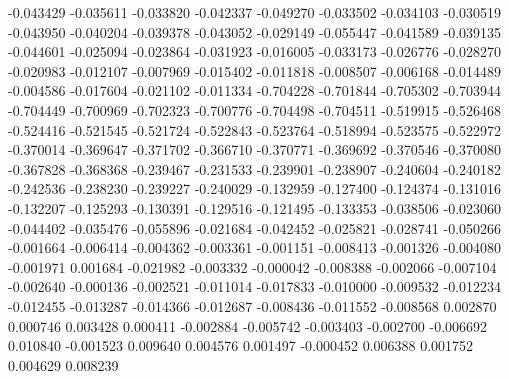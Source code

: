 -0.043429
-0.035611
-0.033820
-0.042337
-0.049270
-0.033502
-0.034103
-0.030519
-0.043950
-0.040204
-0.039378
-0.043052
-0.029149
-0.055447
-0.041589
-0.039135
-0.044601
-0.025094
-0.023864
-0.031923
-0.016005
-0.033173
-0.026776
-0.028270
-0.020983
-0.012107
-0.007969
-0.015402
-0.011818
-0.008507
-0.006168
-0.014489
-0.004586
-0.017604
-0.021102
-0.011334
-0.704228
-0.701844
-0.705302
-0.703944
-0.704449
-0.700969
-0.702323
-0.700776
-0.704498
-0.704511
-0.519915
-0.526468
-0.524416
-0.521545
-0.521724
-0.522843
-0.523764
-0.518994
-0.523575
-0.522972
-0.370014
-0.369647
-0.371702
-0.366710
-0.370771
-0.369692
-0.370546
-0.370080
-0.367828
-0.368368
-0.239467
-0.231533
-0.239901
-0.238907
-0.240604
-0.240182
-0.242536
-0.238230
-0.239227
-0.240029
-0.132959
-0.127400
-0.124374
-0.131016
-0.132207
-0.125293
-0.130391
-0.129516
-0.121495
-0.133353
-0.038506
-0.023060
-0.044402
-0.035476
-0.055896
-0.021684
-0.042452
-0.025821
-0.028741
-0.050266
-0.001664
-0.006414
-0.004362
-0.003361
-0.001151
-0.008413
-0.001326
-0.004080
-0.001971
0.001684
-0.021982
-0.003332
-0.000042
-0.008388
-0.002066
-0.007104
-0.002640
-0.000136
-0.002521
-0.011014
-0.017833
-0.010000
-0.009532
-0.012234
-0.012455
-0.013287
-0.014366
-0.012687
-0.008436
-0.011552
-0.008568
0.002870
0.000746
0.003428
0.000411
-0.002884
-0.005742
-0.003403
-0.002700
-0.006692
0.010840
-0.001523
0.009640
0.004576
0.001497
-0.000452
0.006388
0.001752
0.004629
0.008239
